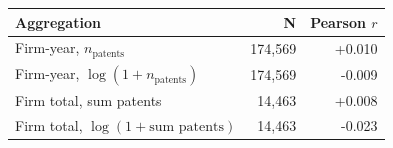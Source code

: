 \begin{tabular}{lrr}
\toprule
Aggregation & N & Pearson $r$ \\
\midrule
Firm-year, $n_{\text{patents}}$ & 174,569 & +0.010 \\
Firm-year, $\log(1+n_{\text{patents}})$ & 174,569 & -0.009 \\
Firm total, sum patents & 14,463 & +0.008 \\
Firm total, $\log(1+\text{sum patents})$ & 14,463 & -0.023 \\
\bottomrule
\end{tabular}
